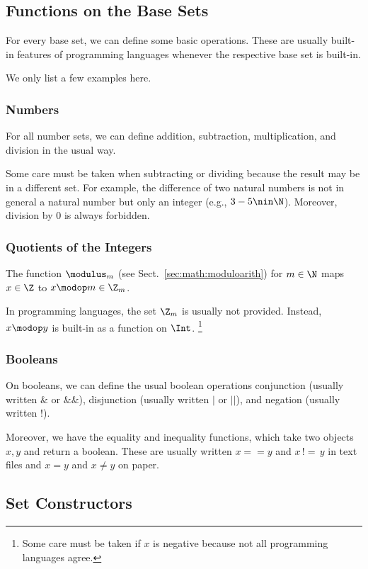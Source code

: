 \subsection{Functions on the Base Sets}\label{sec:math:sets:primfun}

For every base set, we can define some basic operations.
These are usually built-in features of programming languages whenever the respective base set is built-in.

We only list a few examples here.

\subsubsection{Numbers}
For all number sets, we can define addition, subtraction, multiplication, and division in the usual way.

Some care must be taken when subtracting or dividing because the result may be in a different set.
For example, the difference of two natural numbers is not in general a natural number but only an integer (e.g., $3-5\nin\N$).
Moreover, division by $0$ is always forbidden.

\subsubsection{Quotients of the Integers}
The function $\modulus_m$ (see Sect.~\ref{sec:math:moduloarith}) for $m\in \N$ maps $x\in\Z$ to $x\modop m\in\Z_m$.

In programming languages, the set $\Z_m$ is usually not provided.
Instead, $x\modop y$ is built-in as a function on $\Int$.
\footnote{Some care must be taken if $x$ is negative because not all programming languages agree.}

\subsubsection{Booleans}
On booleans, we can define the usual boolean operations conjunction (usually written $\&$ or $\&\&$), disjunction (usually written $|$ or $||$), and negation (usually written $!$).

Moreover, we have the equality and inequality functions, which take two objects $x,y$ and return a boolean.
These are usually written $x==y$ and $x\,!\!=\,y$ in text files and $x=y$ and $x\neq y$ on paper.

\subsection{Set Constructors}\label{sec:math:sets:deriv}

